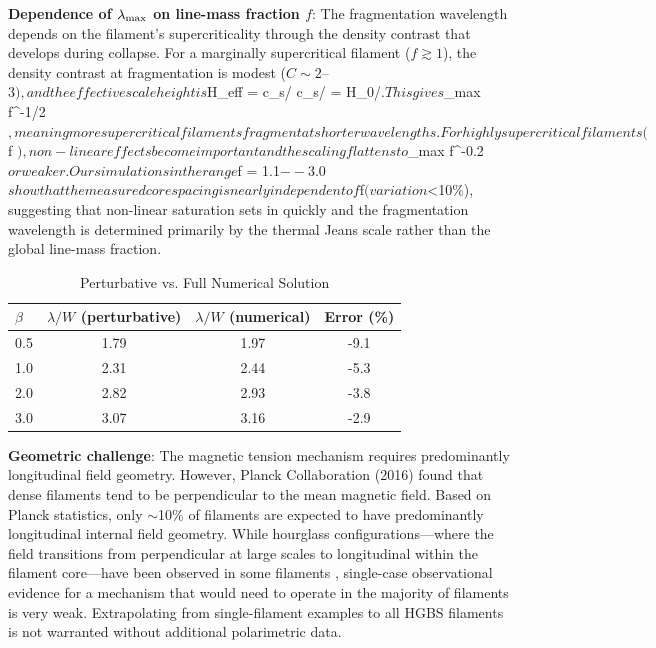 \documentclass[twoside,twocolumn]{mnras}
\begin{document}
\textbf{Dependence of $\lambda_{\rm max}$ on line-mass fraction $f$}: The fragmentation wavelength depends on the filament's supercriticality through the density contrast that develops during collapse. For a marginally supercritical filament ($f \gtrsim 1$), the density contrast at fragmentation is modest ($C \sim 2$--$3), and the effective scale height is $H_{\rm eff} = c_s/ \approx c_s/ = H_0/$. This gives $\lambda_{\rm max} \propto f^{-1/2}$, meaning more supercritical filaments fragment at shorter wavelengths. For highly supercritical filaments ($f $), non-linear effects become important and the scaling flattens to $\lambda_{\rm max} \propto f^{-0.2}$ or weaker. Our simulations in the range $f = 1.1$--$3.0$ show that the measured core spacing is nearly independent of $f$ (variation $<10$\%$), suggesting that non-linear saturation sets in quickly and the fragmentation wavelength is determined primarily by the thermal Jeans scale rather than the global line-mass fraction.

\begin{table}
\caption{Perturbative vs. Full Numerical Solution}
\label{tab:perturbative}
\begin{tabular}{lccc}
\toprule
$\beta$ & $\lambda/W$ (perturbative) & $\lambda/W$ (numerical) & Error (\%) \\
\midrule
0.5 & 1.79 & 1.97 & -9.1 \\
1.0 & 2.31 & 2.44 & -5.3 \\
2.0 & 2.82 & 2.93 & -3.8 \\
3.0 & 3.07 & 3.16 & -2.9 \\
\bottomrule
\end{tabular}
\end{table}

\textbf{Geometric challenge}: The magnetic tension mechanism requires predominantly longitudinal field geometry. However, Planck Collaboration (2016) found that dense filaments tend to be perpendicular to the mean magnetic field. Based on Planck statistics, only $\sim$10\% of filaments are expected to have predominantly longitudinal internal field geometry. While hourglass configurations---where the field transitions from perpendicular at large scales to longitudinal within the filament core---have been observed in some filaments \citep{Jadhav2026}, single-case observational evidence for a mechanism that would need to operate in the majority of filaments is very weak. Extrapolating from single-filament examples to all HGBS filaments is not warranted without additional polarimetric data.
\end{document}
